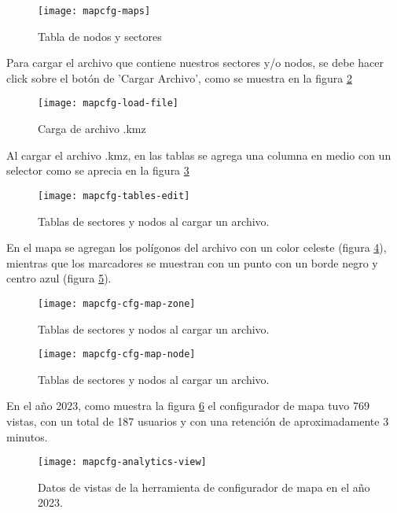 \begin{figure}[H]
	\centering
	\texttt{[image: mapcfg-maps]}
	\caption{\label{fig:mapcfg-maps} Tabla de nodos y sectores}
\end{figure}

Para cargar el archivo que contiene nuestros sectores y/o nodos, se debe hacer click sobre el botón de 'Cargar Archivo', como se muestra en la figura \ref{fig:mapcfg-load-file}

\begin{figure}[H]
	\centering
	\texttt{[image: mapcfg-load-file]}
	\caption{\label{fig:mapcfg-load-file} Carga de archivo .kmz}
\end{figure}

Al cargar el archivo .kmz, en las tablas se agrega una columna en medio con un selector como se aprecia en la figura \ref{fig:mapcfg-tables-edit}

\begin{figure}[H]
	\centering
	\texttt{[image: mapcfg-tables-edit]}
	\caption{\label{fig:mapcfg-tables-edit} Tablas de sectores y nodos al cargar un archivo.}
\end{figure}

En el mapa se agregan los polígonos del archivo con un color celeste (figura \ref{fig:mapcfg-cfg-map-zone}), mientras que los marcadores se muestran con un punto con un borde negro y centro azul (figura \ref{fig:mapcfg-cfg-map-node}).

\begin{figure}[H]
	\centering
	\texttt{[image: mapcfg-cfg-map-zone]}
	\caption{\label{fig:mapcfg-cfg-map-zone} Tablas de sectores y nodos al cargar un archivo.}
\end{figure}

\begin{figure}[H]
	\centering
	\texttt{[image: mapcfg-cfg-map-node]}
	\caption{\label{fig:mapcfg-cfg-map-node} Tablas de sectores y nodos al cargar un archivo.}
\end{figure}


En el año 2023, como muestra la figura \ref{fig:mapcfg-analytics-view} el configurador de mapa tuvo 769 vistas, con un total de 187 usuarios y con una retención de aproximadamente 3 minutos.
\begin{figure}[H]
	\centering
	\texttt{[image: mapcfg-analytics-view]}
	\caption{\label{fig:mapcfg-analytics-view} Datos de vistas de la herramienta de configurador de mapa en el año 2023.}
\end{figure}

